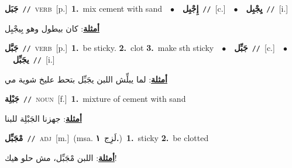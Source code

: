 \documentclass[10pt,a4paper,twoside]{article} %
\begin{document}
\begin{multicols}{2}
{\setlength\topsep{0pt}\textbf{\foreignlanguage{arabic}{جَبَل}}\ {\color{gray}\texttt{//}\color{black}}\ \textsc{verb}\ [p.]\ \textbf{1.}~mix cement with sand\ \ $\bullet$\ \ \setlength\topsep{0pt}\textbf{\foreignlanguage{arabic}{إِجْبِل}}\ {\color{gray}\texttt{//}\color{black}}\ [c.]\ \ $\bullet$\ \ \setlength\topsep{0pt}\textbf{\foreignlanguage{arabic}{يِجْبِل}}\ {\color{gray}\texttt{//}\color{black}}\ [i.]\  \begin{flushright}\color{gray}\foreignlanguage{arabic}{\textbf{\underline{\foreignlanguage{arabic}{أمثلة}}}: كان بيطول وهو بِيجْبِل}\end{flushright}\color{black}} \vspace{2mm}

{\setlength\topsep{0pt}\textbf{\foreignlanguage{arabic}{جَبَّل}}\ {\color{gray}\texttt{//}\color{black}}\ \textsc{verb}\ [p.]\ \textbf{1.}~be sticky.  \textbf{2.}~clot  \textbf{3.}~make sth sticky\ \ $\bullet$\ \ \setlength\topsep{0pt}\textbf{\foreignlanguage{arabic}{جَبِّل}}\ {\color{gray}\texttt{//}\color{black}}\ [c.]\ \ $\bullet$\ \ \setlength\topsep{0pt}\textbf{\foreignlanguage{arabic}{يجَبِّل}}\ {\color{gray}\texttt{//}\color{black}}\ [i.]\  \begin{flushright}\color{gray}\foreignlanguage{arabic}{\textbf{\underline{\foreignlanguage{arabic}{أمثلة}}}: لما يبلِّش اللبن يجَبِّل بتحط عليخ شوية مي}\end{flushright}\color{black}} \vspace{2mm}

{\setlength\topsep{0pt}\textbf{\foreignlanguage{arabic}{جَبْلِة}}\ {\color{gray}\texttt{//}\color{black}}\ \textsc{noun}\ [f.]\ \textbf{1.}~mixture of cement with sand\  \begin{flushright}\color{gray}\foreignlanguage{arabic}{\textbf{\underline{\foreignlanguage{arabic}{أمثلة}}}: جهزنا الجَبْلِة للبنا}\end{flushright}\color{black}} \vspace{2mm}

{\setlength\topsep{0pt}\textbf{\foreignlanguage{arabic}{مْجَبِّل}}\ {\color{gray}\texttt{//}\color{black}}\ \textsc{adj}\ [m.]\ \color{gray}(msa. \foreignlanguage{arabic}{لَزِج}~\foreignlanguage{arabic}{\textbf{١.}})\color{black}\ \textbf{1.}~sticky  \textbf{2.}~be clotted\  \begin{flushright}\color{gray}\foreignlanguage{arabic}{\textbf{\underline{\foreignlanguage{arabic}{أمثلة}}}: اللبن مْجَبِّل، مش حلو هيك!}\end{flushright}\color{black}} \vspace{2mm}


\end{multicols}
\end{document}
